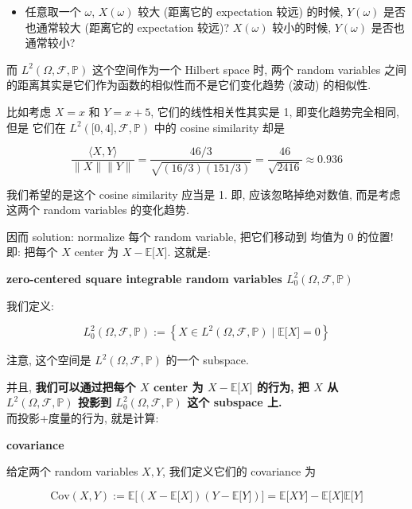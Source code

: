 \documentclass{qlnotes-export}
\begin{document}
\begin{itemize}
\tightlist
\item
  任意取一个 \(\omega\), \(X(\omega)\) 较大 (距离它的 expectation 较远) 的时候, \(Y(\omega)\) 是否也通常较大 (距离它的 expectation 较远)? \(X(\omega)\) 较小的时候, \(Y(\omega)\) 是否也通常较小?
\end{itemize}

而 \(L^{2}(\Omega,\mathcal{F},{\mathbb{P}})\) 这个空间作为一个 Hilbert space 时, 两个 random variables 之间的距离其实是它们作为函数的相似性而不是它们变化趋势 (波动) 的相似性.

比如考虑 \(X = x\) 和 \(Y = x + 5\), 它们的线性相关性其实是 1, 即变化趋势完全相同, 但是 它们在 \(L^{2}(\lbrack 0,4\rbrack,\mathcal{F},{\mathbb{P}})\) 中的 cosine similarity 却是

\[\frac{\langle X,Y\rangle}{\parallel X \parallel \parallel Y \parallel} = \frac{46/3}{\sqrt{(16/3)(151/3)}} = \frac{46}{\sqrt{2416}} \approx 0.936\]

我们希望的是这个 cosine similarity 应当是 1. 即, 应该忽略掉绝对数值, 而是考虑这两个 random variables 的变化趋势.

因而 solution: normalize 每个 random variable, 把它们移动到 均值为 0 的位置! 即: 把每个 \(X\) center 为 \(X - {\mathbb{E}}\lbrack X\rbrack\). 这就是:

\begin{definition}{\protect{}\label{kn-centered-square-integrable-random-variables}{\textbf{zero-centered
square integrable random variables
\(L_{0}^{2}(\Omega,\mathcal{F},{\mathbb{P}})\)}}}

我们定义:

\[L_{0}^{2}(\Omega,\mathcal{F},{\mathbb{P}}) := \left\{ {X \in L^{2}(\Omega,\mathcal{F},{\mathbb{P}}) \mid {\mathbb{E}}\lbrack X\rbrack = 0} \right\}\]

注意, 这个空间是 \(L^{2}(\Omega,\mathcal{F},{\mathbb{P}})\) 的一个 subspace.

\end{definition}

并且, \textbf{我们可以通过把每个 \(X\) center 为 \(X - {\mathbb{E}}\lbrack X\rbrack\) 的行为, 把 \(X\) 从 \(L^{2}(\Omega,\mathcal{F},{\mathbb{P}})\) 投影到 \(L_{0}^{2}(\Omega,\mathcal{F},{\mathbb{P}})\) 这个 subspace 上.}\\
而投影+度量的行为, 就是计算:

\begin{definition}{\protect{}\label{kn-covariance}{\textbf{covariance}}}

给定两个 random variables \(X,Y\), 我们定义它们的 covariance 为

\[\text{Cov}(X,Y) := {\mathbb{E}}\lbrack(X - {\mathbb{E}}\lbrack X\rbrack)(Y - {\mathbb{E}}\lbrack Y\rbrack)\rbrack = {\mathbb{E}}\lbrack XY\rbrack - {\mathbb{E}}\lbrack X\rbrack{\mathbb{E}}\lbrack Y\rbrack\]

\end{definition}
\end{document}
